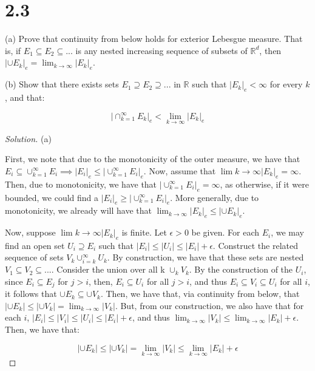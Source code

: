 \documentclass[10pt]{article}
\newenvironment{problem}[2][Problem]{\begin{trivlist}
\item[\hskip \labelsep {\bfseries #1}\hskip \labelsep {\bfseries #2.}]}{\end{trivlist}}
\begin{document}
\section*{2.3}

\begin{problem}{2.4.8}
(a) Prove that continuity from below holds for exterior Lebesgue measure. That is, if $E_1 \subseteq E_2 \subseteq ...$ is any nested increasing sequence of subsets of $\mathbb{R}^d$, then $|\cup E_k|_e = \lim_{k \to \infty} |E_k|_e$.

(b) Show that there exists sets $E_1 \supseteq E_2 \supseteq ...$ in $\mathbb{R}$ such that $|E_k|_e < \infty$ for every $k$, and that:

$$ | \cap_{k=1}^\infty E_k |_e < \lim_{k \rightarrow \infty} |E_k|_e $$
\end{problem}
\begin{proof}[Solution]
(a)

First, we note that due to the monotonicity of the outer measure, we have that $E_i \subseteq \cup_{k=1}^\infty E_i \implies | E_i |_e \leq |\cup_{k=1}^\infty E_i|_e$. Now, assume that $\lim{k \to \infty} |E_k|_e = \infty$. Then, due to monotonicity, we have that $ |\cup_{k=1}^\infty E_i|_e = \infty$, as otherwise, if it were bounded, we could find a $|E_i|_e \geq |\cup_{k=1}^\infty E_i|_e$. More generally, due to monotonicity, we already will have that  $\lim_{k \to \infty} |E_k|_e \leq |\cup E_k|_e$.

Now, suppose $\lim{k \to \infty} |E_k|_e$ is finite. Let $\epsilon > 0$ be given. For each $E_i$, we may find an open set $U_i \supseteq E_i$ such that $|E_i| \leq |U_i| \leq |E_i| + \epsilon$. Construct the related sequence of sets $V_k \cup_{i=k}^\infty U_k$. By construction, we have that these sets are nested $V_1 \subseteq V_2 \subseteq ...$. Consider the union over all k $\cup_k V_k$. By the construction of the $U_i$, since $E_i \subseteq E_j$ for $j > i$, then, $E_i \subseteq U_i$ for all $j > i$, and thus $E_i \subseteq V_i \subseteq U_i$ for all $i$, it follows that $\cup E_k \subseteq \cup V_k$. Then, we have that, via continuity from below, that $|\cup E_k| \leq |\cup V_k| = \lim_{k \to \infty} |V_k|$. But, from our construction, we also have that for each $i$, $|E_i| \leq |V_i| \leq |U_i| \leq |E_i| + \epsilon$, and thus $\lim_{k \to \infty} |V_k| \leq \lim_{k \to \infty} |E_k| + \epsilon$. Then, we have that:

 $$|\cup E_k| \leq |\cup V_k| = \lim_{k \to \infty} |V_k| \leq \lim_{k \to \infty} |E_k| + \epsilon$$


\end{proof}
\end{document}
